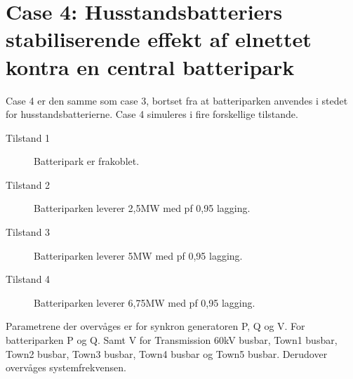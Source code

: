 \section{Case 4: Husstandsbatteriers stabiliserende effekt af elnettet kontra en central batteripark}
\label{SimCase4}
Case 4 er den samme som case 3, bortset fra at batteriparken anvendes i stedet for husstandsbatterierne.
Case 4 simuleres i fire forskellige tilstande.

\begin{description}
	\item[Tilstand 1] Batteripark er frakoblet.
	\item[Tilstand 2] Batteriparken leverer 2,5MW med pf 0,95 lagging.
	\item[Tilstand 3] Batteriparken leverer 5MW med pf 0,95 lagging.
	\item[Tilstand 4] Batteriparken leverer 6,75MW med pf 0,95 lagging.
\end{description}

Parametrene der overvåges er for synkron generatoren P, Q og V.
For batteriparken P og Q. Samt V for Transmission 60kV busbar, Town1 busbar, Town2 busbar, Town3 busbar, Town4 busbar og Town5 busbar.
Derudover overvåges systemfrekvensen.
